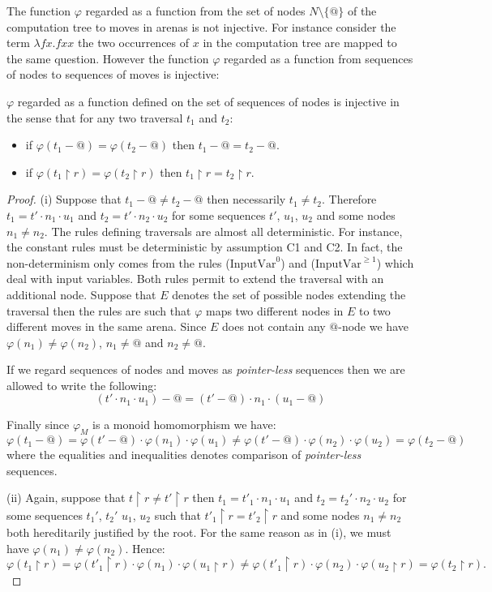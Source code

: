 The function $\varphi$ regarded as a function from the set of nodes $N\setminus\{@\}$ of the computation tree to moves in arenas is not injective.
For instance consider the term $\lambda f x. f x x$ the two occurrences of $x$ in the computation tree are mapped to the same question. However
the function $\varphi$ regarded as a function from sequences of nodes to sequences of moves is injective:
\begin{lem}
$\varphi$ regarded as a function defined on the set of
sequences of nodes is injective in the sense that for any two traversal $t_1$ and $t_2$:
\begin{itemize}
\item[(i)] if $\varphi (t_1 - @ ) = \varphi (t_2 - @ )$ then $t_1-@ =t_2 -@$.
\item[(ii)] if $\varphi (t_1 \upharpoonright r ) = \varphi (t_2 \upharpoonright r )$ then $t_1\upharpoonright r = t_2\upharpoonright r$.
\end{itemize}
\end{lem}
\begin{proof}
(i) Suppose that $t_1-@\neq t_2-@$ then necessarily $t_1 \neq t_2$. Therefore
 $t_1 = t' \cdot n_1 \cdot u_1$ and $t_2 = t' \cdot n_2 \cdot u_2$ for some sequences $t'$, $u_1$, $u_2$
and some nodes $n_1\neq n_2$.
The rules defining traversals are almost all deterministic. For instance, the constant rules must be deterministic by assumption C1 and C2.
In fact, the non-determinism only comes from the rules
($\mbox{InputVar}^0$) and ($\mbox{InputVar}^{\geq 1}$) which deal with input variables. Both rules permit to extend the traversal
with an additional node. Suppose that $E$ denotes the set of possible nodes extending the traversal then the rules are such that
$\varphi$ maps two different nodes in $E$ to two different moves in the same arena. Since $E$ does not contain any $@$-node we have
$\varphi(n_1) \neq \varphi(n_2)$, $n_1 \neq @$ and $n_2 \neq @$.

If we regard sequences of nodes and moves as \emph{pointer-less} sequences then we are allowed to write the following:
$$ (t' \cdot n_1 \cdot u_1) - @ = (t' - @) \cdot n_1 \cdot (u_1 -@)$$

Finally since $\varphi_M$ is a monoid homomorphism we have:
$$ \varphi(t_1-@) = \varphi(t'-@) \cdot \varphi(n_1) \cdot \varphi(u_1) \neq \varphi(t'-@) \cdot \varphi(n_2) \cdot \varphi(u_2) = \varphi(t_2-@) $$
where the equalities and inequalities denotes comparison of \emph{pointer-less} sequences.

(ii) Again, suppose that $t \upharpoonright r \neq t' \upharpoonright r$ then
 $t_1 = t'_1 \cdot n_1 \cdot u_1$ and $t_2 = t_2' \cdot n_2 \cdot u_2$ for some sequences $t_1'$, $t_2'$ $u_1$, $u_2$
 such that $t'_1 \upharpoonright r = t'_2 \upharpoonright r $
and some nodes $n_1 \neq n_2$ both hereditarily justified by the root.
For the same reason as in (i), we must have $\varphi(n_1) \neq \varphi(n_2)$. Hence:
$$ \varphi(t_1\upharpoonright r) =
        \varphi(t'_1\upharpoonright r) \cdot \varphi(n_1) \cdot \varphi(u_1 \upharpoonright r)
    \neq \varphi(t'_1\upharpoonright r) \cdot \varphi(n_2) \cdot \varphi(u_2 \upharpoonright r)
         = \varphi(t_2\upharpoonright r).$$
\end{proof}

